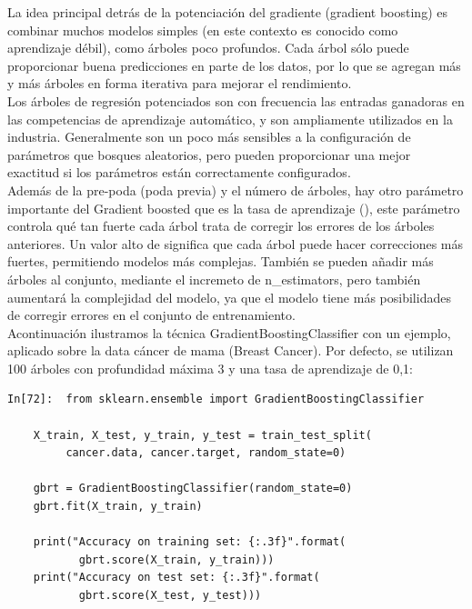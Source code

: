 {La idea principal detrás de la potenciación del gradiente   (gradient boosting) es combinar muchos modelos 
simples (en este contexto es conocido como aprendizaje débil), como árboles poco profundos. 
Cada árbol sólo puede proporcionar buena predicciones en parte de los datos, por lo que se 
agregan más y más árboles en forma iterativa para mejorar el rendimiento.\\

Los árboles de regresión potenciados son con frecuencia las entradas ganadoras en las competencias de aprendizaje automático, y son ampliamente utilizados en la industria. Generalmente son un poco más sensibles a la  configuración de parámetros que bosques aleatorios, pero pueden proporcionar una mejor exactitud si los parámetros  están correctamente configurados.\\



Además de la pre-poda (poda previa) y el número de árboles,  hay otro  parámetro 
 importante  del  Gradient boosted   que es la tasa de aprendizaje  ({}), este parámetro controla qué   tan fuerte cada árbol trata de corregir los errores de los árboles anteriores. Un  valor alto de {}  significa que cada árbol puede hacer correcciones más 
 fuertes, permitiendo modelos  más complejas. También se pueden  añadir más árboles al conjunto, mediante el incremeto de  {\ttfamily n\_estimators}, pero también  aumentará la complejidad del modelo, ya que el 
 modelo tiene más posibilidades de corregir errores en el conjunto de entrenamiento. \\
 
  
 Acontinuación ilustramos la técnica {\ttfamily GradientBoostingClassifier}  con un ejemplo, aplicado 
sobre la data  cáncer de mama (Breast Cancer). Por defecto, se utilizan 100
árboles con profundidad máxima 3 y una tasa de aprendizaje de 0,1:	\\
 

\begin{lstlisting}
In[72]:  from sklearn.ensemble import GradientBoostingClassifier

	X_train, X_test, y_train, y_test = train_test_split(
	     cancer.data, cancer.target, random_state=0)
	
	gbrt = GradientBoostingClassifier(random_state=0)
	gbrt.fit(X_train, y_train)
	
	print("Accuracy on training set: {:.3f}".format(
	       gbrt.score(X_train, y_train)))
	print("Accuracy on test set: {:.3f}".format(
	       gbrt.score(X_test, y_test)))


\end{lstlisting}}
